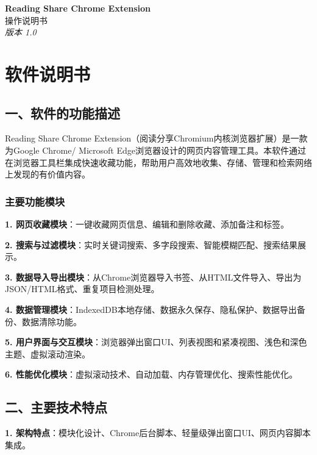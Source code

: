 \documentclass[10pt,a4paper]{article}
\begin{document}
\begin{center}
{\Large\bfseries Reading Share Chrome Extension}\\
\vspace{2pt}
{\large 操作说明书}\\
\vspace{3pt}
\textit{版本 1.0}
\end{center}

\vspace{10pt}

\section*{软件说明书}

\subsection*{一、软件的功能描述}

Reading Share Chrome Extension（阅读分享Chromium内核浏览器扩展）是一款为Google Chrome/ Microsoft Edge浏览器设计的网页内容管理工具。本软件通过在浏览器工具栏集成快速收藏功能，帮助用户高效地收集、存储、管理和检索网络上发现的有价值内容。

\subsubsection*{主要功能模块}

\textbf{1. 网页收藏模块}：一键收藏网页信息、编辑和删除收藏、添加备注和标签。

\textbf{2. 搜索与过滤模块}：实时关键词搜索、多字段搜索、智能模糊匹配、搜索结果展示。

\textbf{3. 数据导入导出模块}：从Chrome浏览器导入书签、从HTML文件导入、导出为JSON/HTML格式、重复项目检测处理。

\textbf{4. 数据管理模块}：IndexedDB本地存储、数据永久保存、隐私保护、数据导出备份、数据清除功能。

\textbf{5. 用户界面与交互模块}：浏览器弹出窗口UI、列表视图和紧凑视图、浅色和深色主题、虚拟滚动渲染。

\textbf{6. 性能优化模块}：虚拟滚动技术、自动加载、内存管理优化、搜索性能优化。

\subsection*{二、主要技术特点}

\textbf{1. 架构特点}：模块化设计、Chrome后台脚本、轻量级弹出窗口UI、网页内容脚本集成。
\end{document}
